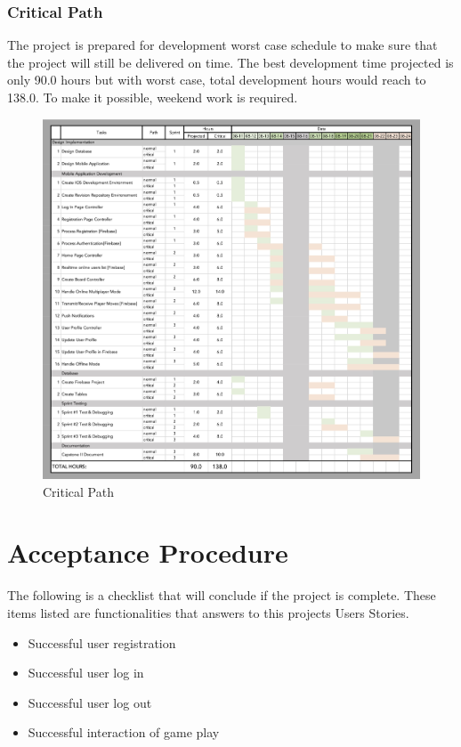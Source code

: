 \documentclass{article}
\begin{document}
        \subsubsection{Critical Path}
        The project is prepared for development worst case schedule to make sure that the project will still be delivered on time.  The best development time projected is only 90.0 hours but with worst case, total development hours would reach to 138.0. To make it possible, weekend work is required.
        \begin{figure}[h]
            \centering
            \includegraphics[width=5.5in]{images/Gantt Critical.png}
        \caption{Critical Path}
        \end{figure}
        \newpage
        
        
\section{Acceptance Procedure}
The following is a checklist that will conclude if the project is complete.  These items listed are functionalities that answers to this projects Users Stories.
    \begin{itemize}
        \item Successful user registration
        \item Successful user log in
        \item Successful user log out
        \item Successful interaction of game play
    \end{itemize}
    ~\\
    
\end{document}
